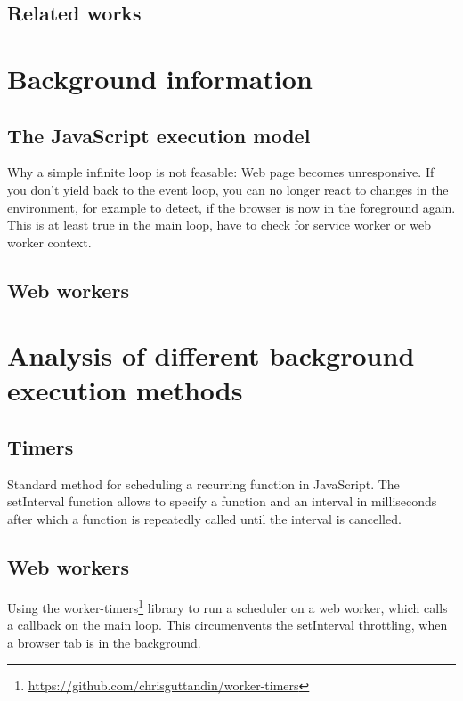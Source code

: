 \documentclass[article,type=bsc,colorback,accentcolor=tud9c]{tudthesis}
\begin{document}
  \subsection{Related works}

  
  \newpage
  \section{Background information}
  
  \subsection{The JavaScript execution model}

  Why a simple infinite loop is not feasable: Web page becomes unresponsive. If you don't yield back to the event loop, you can no longer react to changes in the environment, for example to detect, if the browser is now in the foreground again. This is at least true in the main loop, have to check for service worker or web worker context.
  
  \subsection{Web workers}

  

  \newpage
  \section{Analysis of different background execution methods}

  
  
  \subsection{Timers}

  Standard method for scheduling a recurring function in JavaScript. The setInterval function allows to specify a function and an interval in milliseconds after which a function is repeatedly called until the interval is cancelled.
  
  \subsection{Web workers}
  
  Using the worker-timers\footnote{\url{https://github.com/chrisguttandin/worker-timers}} library to run a scheduler on a web worker, which calls a callback on the main loop. This circumenvents the setInterval throttling, when a browser tab is in the background.
\end{document}
